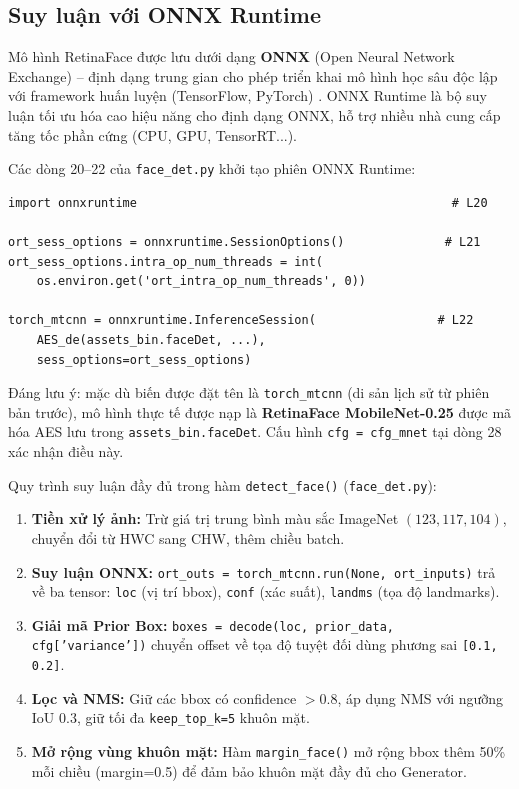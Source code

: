 \subsection{Suy luận với ONNX Runtime}
\label{subsec:onnx_inference}

Mô hình RetinaFace được lưu dưới dạng \textbf{ONNX} (Open Neural
Network Exchange) -- định dạng trung gian cho phép triển khai mô hình học sâu độc lập
với framework huấn luyện (TensorFlow, PyTorch) \cite{ONNX2019}. ONNX Runtime là bộ suy
luận tối ưu hóa cao hiệu năng cho định dạng ONNX, hỗ trợ nhiều nhà cung cấp tăng tốc
phần cứng (CPU, GPU, TensorRT...).

Các dòng 20--22 của \texttt{face\_det.py} khởi tạo phiên ONNX Runtime:
\begin{verbatim}
import onnxruntime                                            # L20

ort_sess_options = onnxruntime.SessionOptions()              # L21
ort_sess_options.intra_op_num_threads = int(               
    os.environ.get('ort_intra_op_num_threads', 0))

torch_mtcnn = onnxruntime.InferenceSession(                 # L22
    AES_de(assets_bin.faceDet, ...),
    sess_options=ort_sess_options)
\end{verbatim}

Đáng lưu ý: mặc dù biến được đặt tên là \texttt{torch\_mtcnn} (di sản lịch sử từ phiên
bản trước), mô hình thực tế được nạp là \textbf{RetinaFace MobileNet-0.25} được mã hóa AES
lưu trong \texttt{assets\_bin.faceDet}. Cấu hình \texttt{cfg = cfg\_mnet} tại dòng 28 xác
nhận điều này.

Quy trình suy luận đầy đủ trong hàm \texttt{detect\_face()} (\texttt{face\_det.py}):

\begin{enumerate}
    \item \textbf{Tiền xử lý ảnh:} Trừ giá trị trung bình màu sắc ImageNet
    $(123, 117, 104)$, chuyển đổi từ HWC sang CHW, thêm chiều batch.
    \item \textbf{Suy luận ONNX:} \texttt{ort\_outs = torch\_mtcnn.run(None, ort\_inputs)}
    trả về ba tensor: \texttt{loc} (vị trí bbox), \texttt{conf} (xác suất), \texttt{landms}
    (tọa độ landmarks).
    \item \textbf{Giải mã Prior Box:}
    \texttt{boxes = decode(loc, prior\_data, cfg['variance'])} chuyển offset về tọa độ
    tuyệt đối dùng phương sai \texttt{[0.1, 0.2]}.
    \item \textbf{Lọc và NMS:} Giữ các bbox có confidence $> 0.8$, áp dụng NMS với
    ngưỡng IoU $0.3$, giữ tối đa \texttt{keep\_top\_k=5} khuôn mặt.
    \item \textbf{Mở rộng vùng khuôn mặt:} Hàm \texttt{margin\_face()} mở rộng bbox
    thêm 50\% mỗi chiều (margin=0.5) để đảm bảo khuôn mặt đầy đủ cho Generator.
\end{enumerate}

